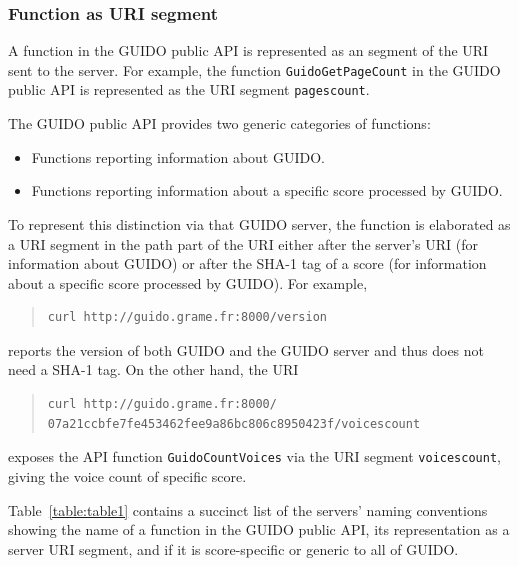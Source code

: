 \documentclass{article}
\newcommand{\guidosize}{6pt}
\begin{document}
\subsubsection{Function as URI segment}
A function in the GUIDO public API is represented as an segment of the URI sent to the server.  For example, the function \verb=GuidoGetPageCount= in the GUIDO public API is represented as the URI segment \verb=pagescount=.\par
The GUIDO public API provides two generic categories of functions:
\begin{itemize}[noitemsep]
\item Functions reporting information about GUIDO.
\item Functions reporting information about a specific score processed by GUIDO.
\end{itemize}
To represent this distinction via that GUIDO server, the function is elaborated as a URI segment in the path part of the URI either after the server's URI (for information about GUIDO) or after the SHA-1 tag of a score (for information about a specific score processed by GUIDO).  For example,
\begin{quote}
\begingroup
\fontsize{\guidosize}{12pt}\selectfont
\begin{verbatim}
curl http://guido.grame.fr:8000/version
\end{verbatim}
\endgroup
\end{quote}
reports the version of both GUIDO and the GUIDO server and thus does not need a SHA-1 tag.  On the other hand, the URI
\begin{quote}
\begingroup
\fontsize{\guidosize}{12pt}\selectfont
\begin{verbatim}
curl http://guido.grame.fr:8000/
07a21ccbfe7fe453462fee9a86bc806c8950423f/voicescount
\end{verbatim}
\endgroup
\end{quote}
exposes the API function \verb=GuidoCountVoices= via the URI segment \verb=voicescount=, giving the voice count of specific score.\par
Table~\ref{table:table1} contains a succinct list of the servers' naming conventions showing the name of a function in the GUIDO public API, its representation as a server URI segment, and if it is score-specific or generic to all of GUIDO.
\end{document}
